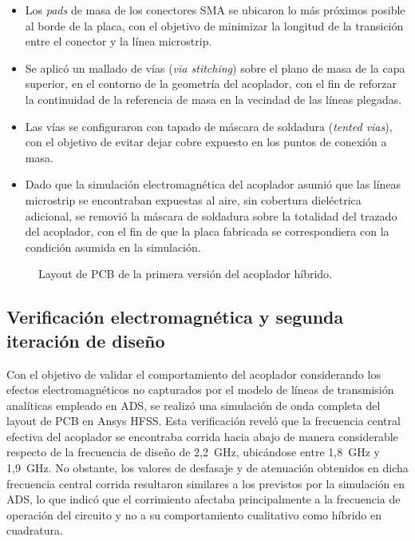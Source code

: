 \begin{itemize}
    \item Los \textit{pads} de masa de los conectores SMA se ubicaron lo más próximos posible al borde de la placa, con el objetivo de minimizar la longitud de la transición entre el conector y la línea microstrip.
    \item Se aplicó un mallado de vías (\textit{via stitching}) sobre el plano de masa de la capa superior, en el contorno de la geometría del acoplador, con el fin de reforzar la continuidad de la referencia de masa en la vecindad de las líneas plegadas.
    \item Las vías se configuraron con tapado de máscara de soldadura (\textit{tented vias}), con el objetivo de evitar dejar cobre expuesto en los puntos de conexión a masa.
    \item Dado que la simulación electromagnética del acoplador asumió que las líneas microstrip se encontraban expuestas al aire, sin cobertura dieléctrica adicional, se removió la máscara de soldadura sobre la totalidad del trazado del acoplador, con el fin de que la placa fabricada se correspondiera con la condición asumida en la simulación.
\end{itemize}

\begin{figure}[H]
    \centering
    \caption{Layout de PCB de la primera versión del acoplador híbrido.}
    \label{fig:acoplador_pcb_v1}
\end{figure}

\subsection{Verificación electromagnética y segunda iteración de diseño}
Con el objetivo de validar el comportamiento del acoplador considerando los efectos electromagnéticos no capturados por el modelo de líneas de transmisión analíticas empleado en ADS, se realizó una simulación de onda completa del layout de PCB en Ansys HFSS. Esta verificación reveló que la frecuencia central efectiva del acoplador se encontraba corrida hacia abajo de manera considerable respecto de la frecuencia de diseño de 2,2~GHz, ubicándose entre 1,8~GHz y 1,9~GHz. No obstante, los valores de desfasaje y de atenuación obtenidos en dicha frecuencia central corrida resultaron similares a los previstos por la simulación en ADS, lo que indicó que el corrimiento afectaba principalmente a la frecuencia de operación del circuito y no a su comportamiento cualitativo como híbrido en cuadratura.

